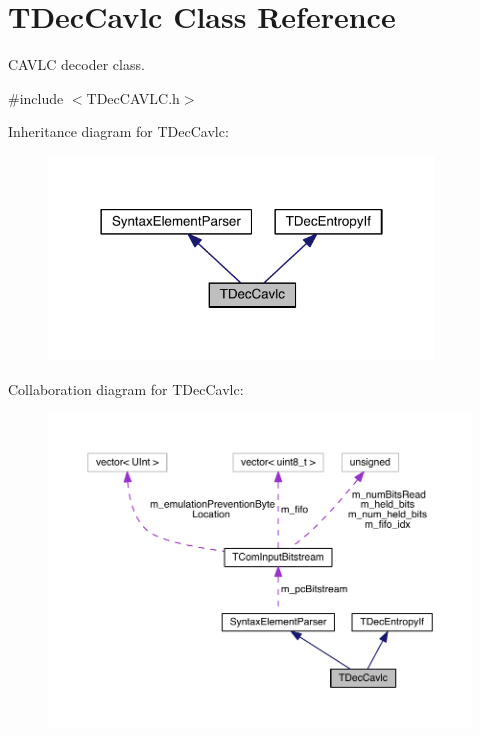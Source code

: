 \hypertarget{class_t_dec_cavlc}{}\section{T\+Dec\+Cavlc Class Reference}
\label{class_t_dec_cavlc}


C\+A\+V\+LC decoder class.  




{\ttfamily \#include $<$T\+Dec\+C\+A\+V\+L\+C.\+h$>$}



Inheritance diagram for T\+Dec\+Cavlc\+:
\nopagebreak
\begin{figure}[H]
\begin{center}
\leavevmode
\includegraphics[width=290pt]{db/d27/class_t_dec_cavlc__inherit__graph}
\end{center}
\end{figure}


Collaboration diagram for T\+Dec\+Cavlc\+:
\nopagebreak
\begin{figure}[H]
\begin{center}
\leavevmode
\includegraphics[width=350pt]{dd/dc6/class_t_dec_cavlc__coll__graph}
\end{center}
\end{figure}
